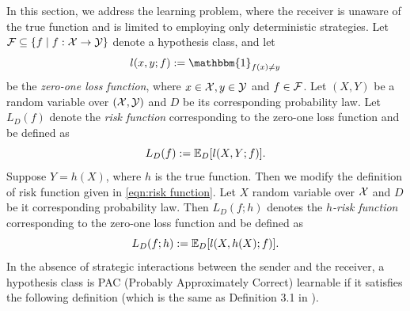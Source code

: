 In this section, we address the learning problem, where the receiver is unaware of the true function and is limited to employing only deterministic strategies. Let $\mathcal{F} \subseteq \{f \mid f:\mathcal{X} \rightarrow \mathcal{Y}\}$  denote a hypothesis class, and let  $$ l(x,y; f) := \mathbbm{1}_{f(x) \neq y} $$
be the \textit{zero-one loss function}, where $x \in \mathcal{X}, y \in \mathcal{Y}$ and $f \in \mathcal{F}$.
Let $(X,Y)$ be a random variable over $(\mathcal{X},\mathcal{Y})$ and $D$ be its corresponding probability law.
Let $L_{D}(f)$ denote the \textit{risk function} corresponding to the zero-one loss function and be defined as 
\begin{equation}\label{eqn:risk function}
    L_D(f) :=
    \mathbb{E}_{D}[l(X,Y;f)].
\end{equation}
Suppose $Y = h(X)$, where $h$ is the true function. Then we modify the definition of risk function given in \eqref{eqn:risk function}.
Let $X$ random variable over $\mathcal{X}$ and $D$ be it corresponding probability law. Then $L_D(f;h)$ denotes the \textit{$h$-risk function} corresponding to the zero-one loss function and be defined as 
\begin{equation}
    L_D(f;h) :=   \mathbb{E}_{D}[l(X,h(X);f)].
\end{equation}
In the absence of strategic interactions between the sender and the receiver, a hypothesis class is PAC (Probably Approximately Correct) learnable if it satisfies the following definition (which is the same as Definition 3.1 in \cite{shalev-shwartz_ben-david_2014}).


